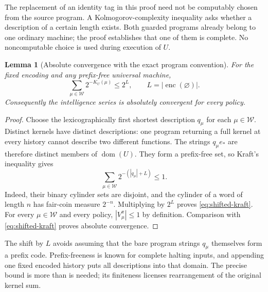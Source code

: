 \documentclass[11pt]{article}
\newtheorem{lemma}[theorem]{Lemma}
\theoremstyle{definition}
\theoremstyle{remark}
\newcommand{\W}{\mathcal W}
\newcommand{\enc}{\operatorname{enc}}
\newcommand{\dom}{\operatorname{dom}}
\begin{document}
The replacement of an identity tag in this proof need not be
computably chosen from the source program.  A Kolmogorov-complexity
inequality asks whether a description of a certain length exists.
Both guarded programs already belong to one ordinary machine; the
proof establishes that one of them is complete.  No noncomputable
choice is used during execution of $U$.

\begin{lemma}[Absolute convergence with the exact program convention]
\label{lem:kraft}
For the fixed encoding and any prefix-free universal machine,
\begin{equation}
  \sum_{\mu\in\W}2^{-K_U(\mu)}\le2^L,
  \qquad L=|\enc(\varnothing)|.
  \label{eq:shifted-kraft}
\end{equation}
Consequently the intelligence series is absolutely convergent for
every policy.
\end{lemma}

\begin{proof}
Choose the lexicographically first shortest description $q_\mu$ for
each $\mu\in\W$.  Distinct kernels have distinct descriptions:
one program returning a full kernel at every history cannot describe
two different functions.  The strings $q_\mu e_*$ are therefore
distinct members of $\dom(U)$.  They form a prefix-free set, so
Kraft's inequality gives
\[
  \sum_{\mu\in\W}2^{-(|q_\mu|+L)}\le1.
\]
Indeed, their binary cylinder sets are disjoint, and the cylinder of a
word of length $n$ has fair-coin measure $2^{-n}$.
Multiplying by $2^L$ proves \eqref{eq:shifted-kraft}.  For every
$\mu\in\W$ and every policy, $|V_\mu^\pi|\le1$ by definition.
Comparison with \eqref{eq:shifted-kraft} proves absolute
convergence.
\end{proof}

The shift by $L$ avoids assuming that the bare program strings
$q_\mu$ themselves form a prefix code.  Prefix-freeness is known
for complete halting inputs, and appending one fixed encoded history
puts all descriptions into that domain.  The precise bound is more
than is needed; its finiteness licenses rearrangement of the original
kernel sum.
\end{document}
